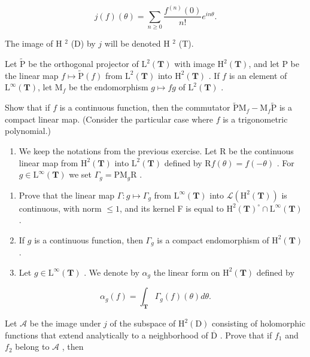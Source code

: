 \[
j (f) (\theta) = \sum_ {n \geqslant 0} \frac {f ^ {(n)} (0)}{n !} e ^ {i n \theta}.
\]

The image of H \(^{2}\) (D) by \(j\) will be denoted H \(^{2}\) (T).

Let \(\widetilde{\mathrm{P}}\) be the orthogonal projector of \(\mathrm{L}^2 (\mathbf{T})\) with image \(\mathrm{H}^2 (\mathbf{T})\), and let P be the linear map \(f\mapsto \widetilde{\mathrm{P}} (f)\) from \(\mathrm{L}^2 (\mathbf{T})\) into \(\mathrm{H}^2 (\mathbf{T})\) . If \(f\) is an element of \(\mathrm{L}^{\infty}(\mathbf{T})\), let \(\mathrm{M}_f\) be the endomorphism \(g\mapsto fg\) of \(\mathrm{L}^2 (\mathbf{T})\) .

Show that if \(f\) is a continuous function, then the commutator \(\widetilde{\mathrm{P}}\mathrm{M}_f - \mathrm{M}_f\widetilde{\mathrm{P}}\) is a compact linear map. (Consider the particular case where \(f\) is a trigonometric polynomial.)

\begin{enumerate}
\def\labelenumi{\arabic{enumi})}
\setcounter{enumi}{21}
\tightlist
\item
  We keep the notations from the previous exercise. Let R be the continuous linear map from \(\mathrm{H}^{2}(\mathbf{T})\) into \(\mathrm{L}^{2}(\mathbf{T})\) defined by \(\mathrm{R}f(\theta)=f(-\theta)\) . For \(g\in\mathrm{L}^{\infty}(\mathbf{T})\) we set \(\Gamma_{g}=\mathrm{PM}_{g}\mathrm{R}\) .
\end{enumerate}

\begin{enumerate}
\def\labelenumi{\alph{enumi})}
\item
  Prove that the linear map \(\Gamma\colon g\mapsto\Gamma_{g}\) from \(\mathrm{L}^{\infty}(\mathbf{T})\) into \(\mathcal{L}(\mathrm{H}^{2}(\mathbf{T}))\) is continuous, with norm \(\leqslant 1\), and its kernel F is equal to \(\mathrm{H}^{2}(\mathbf{T})^{\circ}\cap\mathrm{L}^{\infty}(\mathbf{T})\) .
\item
  If \(g\) is a continuous function, then \(\Gamma_g\) is a compact endomorphism of \(\mathrm{H}^2 (\mathbf{T})\) .
\item
  Let \(g \in \mathrm{L}^{\infty}(\mathbf{T})\) . We denote by \(\alpha_{g}\) the linear form on \(\mathrm{H}^{2}(\mathbf{T})\) defined by
\end{enumerate}

\[
\alpha_ {g} (f) = \int_ {\mathbf {T}} \Gamma_ {g} (f) (\theta) d \theta .
\]

Let \(\mathcal{A}\) be the image under \(j\) of the subspace of \(\mathrm{H}^2 (\mathrm{D})\) consisting of holomorphic functions that extend analytically to a neighborhood of \(\overline{\mathrm{D}}\) . Prove that if \(f_{1}\) and \(f_{2}\) belong to \(\mathcal{A}\) , then

